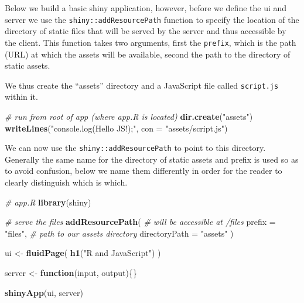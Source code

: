 \documentclass[
]{krantz}
\makeatletter
\newenvironment{Shaded}{\begin{snugshade}}{\end{snugshade}}
\newcommand{\CommentTok}[1]{\textcolor[rgb]{0.37,0.37,0.37}{\textit{#1}}}
\newcommand{\ControlFlowTok}[1]{\textcolor[rgb]{0.27,0.27,0.27}{\textbf{#1}}}
\newcommand{\DataTypeTok}[1]{\textcolor[rgb]{0.27,0.27,0.27}{#1}}
\newcommand{\KeywordTok}[1]{\textcolor[rgb]{0.27,0.27,0.27}{\textbf{#1}}}
\newcommand{\NormalTok}[1]{#1}
\newcommand{\StringTok}[1]{\textcolor[rgb]{0.5,0.5,0.5}{#1}}
\newenvironment{kframe}{%
\medskip{}
\setlength{\fboxsep}{.8em}
 \def\at@end@of@kframe{}%
 \ifinner\ifhmode%
  \def\at@end@of@kframe{\end{minipage}}%
  \begin{minipage}{\columnwidth}%
 \fi\fi%
 \def\FrameCommand##1{\hskip\@totalleftmargin \hskip-\fboxsep
 \colorbox{shadecolor}{##1}\hskip-\fboxsep
     \hskip-\linewidth \hskip-\@totalleftmargin \hskip\columnwidth}%
 \MakeFramed {\advance\hsize-\width
   \@totalleftmargin\z@ \linewidth\hsize
   \@setminipage}}%
 {\par\unskip\endMakeFramed%
 \at@end@of@kframe}
\renewenvironment{Shaded}{\begin{kframe}}{\end{kframe}}
\makeatother
\begin{document}
Below we build a basic shiny application, however, before we define the ui and server we use the \texttt{shiny::addResourcePath} function to specify the location of the directory of static files that will be served by the server and thus accessible by the client. This function takes two arguments, first the \texttt{prefix}, which is the path (URL) at which the assets will be available, second the path to the directory of static assets.

We thus create the ``assets'' directory and a JavaScript file called \texttt{script.js} within it.

\begin{Shaded}
\begin{Highlighting}[]
\CommentTok{\# run from root of app (where app.R is located)}
\KeywordTok{dir.create}\NormalTok{(}\StringTok{"assets"}\NormalTok{)}
\KeywordTok{writeLines}\NormalTok{(}\StringTok{"console.log(\textquotesingle{}Hello JS!\textquotesingle{});"}\NormalTok{, }\DataTypeTok{con =} \StringTok{"assets/script.js"}\NormalTok{)}
\end{Highlighting}
\end{Shaded}

We can now use the \texttt{shiny::addResourcePath} to point to this directory. Generally the same name for the directory of static assets and prefix is used so as to avoid confusion, below we name them differently in order for the reader to clearly distinguish which is which.

\begin{Shaded}
\begin{Highlighting}[]
\CommentTok{\# app.R}
\KeywordTok{library}\NormalTok{(shiny)}

\CommentTok{\# serve the files}
\KeywordTok{addResourcePath}\NormalTok{(}
  \CommentTok{\# will be accessible at /files}
  \DataTypeTok{prefix =} \StringTok{"files"}\NormalTok{, }
  \CommentTok{\# path to our assets directory}
  \DataTypeTok{directoryPath =} \StringTok{"assets"}
\NormalTok{)}

\NormalTok{ui <{-}}\StringTok{ }\KeywordTok{fluidPage}\NormalTok{(}
  \KeywordTok{h1}\NormalTok{(}\StringTok{"R and JavaScript"}\NormalTok{)}
\NormalTok{)}

\NormalTok{server <{-}}\StringTok{ }\ControlFlowTok{function}\NormalTok{(input, output)\{\}}

\KeywordTok{shinyApp}\NormalTok{(ui, server)}
\end{Highlighting}
\end{Shaded}
\end{document}
